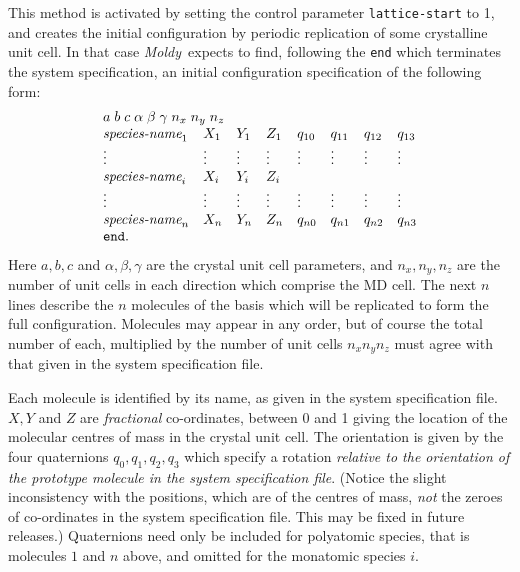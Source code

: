 \documentclass[twoside]{report}
\newcommand{\moldy}{{\em Moldy}}
\begin{document}
This method is activated by setting the control parameter
\texttt{lattice-start} to 1, and creates the initial configuration by
periodic replication of some crystalline unit cell.  In that case
\moldy\  expects to find, following the \texttt{end} which terminates the
system specification, an initial configuration specification of the
following form:
\begin{displaymath}
\begin{array}{llllllll}
\multicolumn{8}{l}{a\;b\;c\;\alpha\;\beta\;\gamma\;n_{x}\;n_{y}\;n_{z}} \\
\mbox{{\it species-name}}_{1} &
X_{1} & Y_{1} & Z_{1} &  q_{10} & q_{11} & q_{12} & q_{13} \\
\vdots &  \vdots & \vdots & \vdots & \vdots & \vdots & \vdots & \vdots \\
\mbox{{\it species-name}}_{i} & X_{i} & Y_{i} & Z_{i} \\
\vdots &  \vdots & \vdots & \vdots & \vdots & \vdots & \vdots & \vdots \\
\mbox{{\it species-name}}_{n} &
X_{n} & Y_{n} & Z_{n} &  q_{n0} & q_{n1} & q_{n2} & q_{n3}  \\
\mbox{\texttt{end}}. \\
\end{array}
\end{displaymath}
Here $a, b, c$ and $\alpha, \beta, \gamma$ are the crystal unit cell
parameters, and $n_{x}, n_{y}, n_{z}$ are the number of unit cells in
each direction which comprise the MD cell.  The next $n$ lines
describe the $n$ molecules of the basis which will be replicated to
form the full configuration.  Molecules may appear in any order, but
of course the total number of each, multiplied by the number of unit
cells $n_{x} n_{y} n_{z}$ must agree with that given in the system
specification file.

Each molecule is identified by its name, as given in the system
specification file.  $X, Y$ and $Z$ are {\em fractional\/} co-ordinates,
between 0 and 1 giving the location of the molecular centres of mass in
the crystal unit cell. The orientation is given by the four
quaternions $q_{0}, q_{1}, q_{2}, q_{3}$ which specify a rotation {\em
relative to the orientation of the prototype molecule in the system
specification file}.  (Notice the slight inconsistency with the
positions, which are of the centres of mass, {\em not\/} the zeroes of
co-ordinates in the system specification file. This may be fixed in
future releases.)  Quaternions need only be included for
polyatomic species, that is molecules $1$ and $n$ above, and omitted
for the monatomic species $i$.
\end{document}

